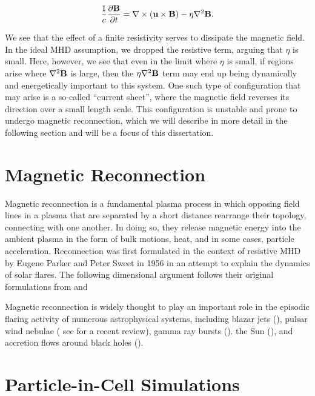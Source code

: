 \begin{equation}
		\frac{1}{c}\frac{\partial \bold{B}}{\partial t} =\nabla \times (\bold{u}\times\bold{B}) -\eta \nabla^2 \bold{B}.
\end{equation}

We see that the effect of a finite resistivity serves to dissipate the magnetic field.  In the ideal MHD assumption, we dropped the resistive term, arguing that $\eta$ is small.  Here, however, we see that even in the limit where $\eta$ is small, if regions arise where $\nabla^2 \bold{B}$ is large, then the $\eta \nabla^2 \bold{B}$ term may end up being dynamically and energetically important to this system.  One such type of configuration that may arise is a so-called ``current sheet'', where the magnetic field reverses its direction over a small length scale.  This configuration is unstable and prone to undergo magnetic reconnection, which we will describe in more detail in the following section and will be a focus of this dissertation.

\section{Magnetic Reconnection}
Magnetic reconnection is a fundamental plasma process in which opposing field lines in a plasma that are separated by a short distance rearrange their topology, connecting with one another.  In doing so, they release magnetic energy into the ambient plasma in the form of bulk motions, heat, and in some cases, particle acceleration.  Reconnection was first formulated in the context of resistive MHD by Eugene Parker and Peter Sweet in 1956 in an attempt to explain the dynamics of solar flares.  The following dimensional argument follows their original formulations from \citet{parker1957} and \cite{sweet1958}

Magnetic reconnection is widely thought to play an important role in the episodic flaring activity of numerous astrophysical systems, including blazar jets (\citealt{giannios2013, petropoulou2016, nalewajko2016}), pulsar wind nebulae (\citealt{coroniti1990, lyubarsky2001, zenitani2001, kirk2003, contopoulos2007, petri2008, sironi2011, cerutti2012,cerutti2014,cerutti2017, philippov2014} see \citealt{sironi2017} for a recent review), gamma ray bursts (\citealt{thompson1994, thompson2006, usov1994, spruit2001, drenkhahn2002, lyutikov2003, giannios2008}). the Sun (\citealt{forbes1996, yokoyama2001, shibata2011}), and accretion flows around black holes (\citealt{galeev1979, dimatteo1998, uzdensky2008, li2015, ball2016, li2017}).


\section{Particle-in-Cell Simulations}


